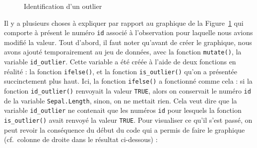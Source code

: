 \documentclass[
  letterpaper,
]{book}
\begin{document}
\begin{figure}[H]


\caption{\label{fig-geomboxplotOutlierId}Identification d'un outlier}

\end{figure}%

Il y a plusieurs choses à expliquer par rapport au graphique de la
Figure~\ref{fig-geomboxplotOutlierId} qui comporte à présent le numéro
\texttt{id} associé à l'observation pour laquelle nous avions modifié la
valeur. Tout d'abord, il faut noter qu'avant de créer le graphique, nous
avons ajouté temporairement au jeu de données, avec la fonction
\texttt{mutate()}, la variable \texttt{id\_outlier}. Cette variable a
été créée à l'aide de deux fonctions en réalité : la fonction
\texttt{ifelse()}, et la fonction \texttt{is\_outlier()} qu'on a
présentée succinctement plus haut. Ici, la fonction \texttt{ifelse()} a
fonctionné comme cela : si la fonction \texttt{id\_outlier()} renvoyait
la valeur \texttt{TRUE}, alors on conservait le numéro \texttt{id} de la
variable \texttt{Sepal.Length}, sinon, on ne mettait rien. Cela veut
dire que la variable \texttt{id\_outlier} ne contenait que les numéros
\texttt{id} pour lesquels la fonction \texttt{is\_outlier()} avait
renvoyé la valeur \texttt{TRUE}. Pour visualiser ce qu'il s'est passé,
on peut revoir la conséquence du début du code qui a permis de faire le
graphique (cf.~colonne de droite dans le résultat ci-dessous) :
\end{document}
